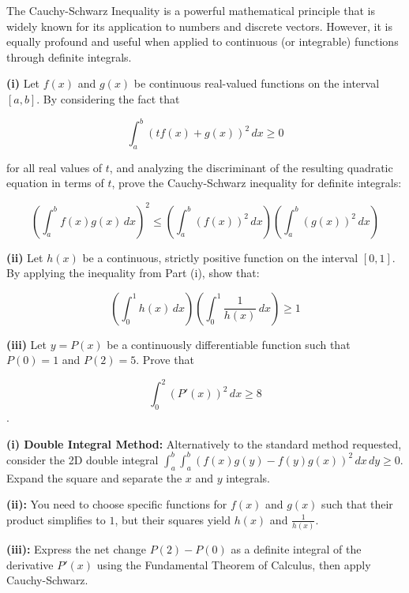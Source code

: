 \begin{problem}
The Cauchy-Schwarz Inequality is a powerful mathematical principle that is widely known for its application to numbers and discrete vectors. However, it is equally profound and useful when applied to continuous (or integrable) functions through definite integrals.


\vspace*{1em}

\textbf{(i)}
Let $f(x)$ and $g(x)$ be continuous real-valued functions on the interval $[a, b]$. By considering the fact that 

$$\int_a^b (t f(x) + g(x))^2 \, dx \ge 0$$ 

for all real values of $t$, and analyzing the discriminant of the resulting quadratic equation in terms of $t$, prove the Cauchy-Schwarz inequality for definite integrals:

$$\left( \int_a^b f(x)g(x) \, dx \right)^2 \le \left( \int_a^b (f(x))^2 \, dx \right) \left( \int_a^b (g(x))^2 \, dx \right)$$

\vspace*{1em}

\textbf{(ii)}
Let $h(x)$ be a continuous, strictly positive function on the interval $[0, 1]$. By applying the inequality from Part (i), show that:

$$\left( \int_0^1 h(x) \, dx \right) \left( \int_0^1 \frac{1}{h(x)} \, dx \right) \ge 1$$

\vspace*{1em}

\textbf{(iii)}
Let $y = P(x)$ be a continuously differentiable function such that $P(0) = 1$ and $P(2) = 5$.
Prove that 

$$\int_0^2 (P'(x))^2 \, dx \ge 8$$.

\end{problem}

\begin{hint}
    \item \textbf{(i) Double Integral Method:} Alternatively to the standard method requested, consider the 2D double integral $\int_a^b \int_a^b (f(x)g(y) - f(y)g(x))^2 \, dx \, dy \ge 0$. Expand the square and separate the $x$ and $y$ integrals.
    \item \textbf{(ii):} You need to choose specific functions for $f(x)$ and $g(x)$ such that their product simplifies to $1$, but their squares yield $h(x)$ and $\frac{1}{h(x)}$.
    \item \textbf{(iii):} Express the net change $P(2) - P(0)$ as a definite integral of the derivative $P'(x)$ using the Fundamental Theorem of Calculus, then apply Cauchy-Schwarz.
\end{hint}


